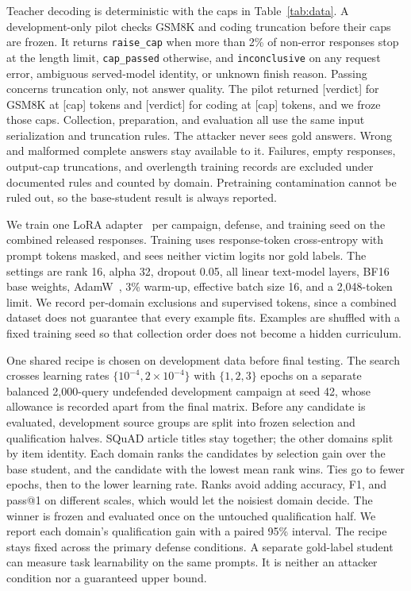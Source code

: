 \documentclass[journal]{IEEEtran}
\newcommand{\tbd}[1]{\textcolor{red!65!black}{[#1]}}
\begin{document}
Teacher decoding is deterministic with the caps in Table~\ref{tab:data}. A development-only pilot checks GSM8K and coding truncation before their caps are frozen. It returns \texttt{raise\_cap} when more than 2\% of non-error responses stop at the length limit, \texttt{cap\_passed} otherwise, and \texttt{inconclusive} on any request error, ambiguous served-model identity, or unknown finish reason. Passing concerns truncation only, not answer quality. The pilot returned \tbd{verdict} for GSM8K at \tbd{cap} tokens and \tbd{verdict} for coding at \tbd{cap} tokens, and we froze those caps. Collection, preparation, and evaluation all use the same input serialization and truncation rules. The attacker never sees gold answers. Wrong and malformed complete answers stay available to it. Failures, empty responses, output-cap truncations, and overlength training records are excluded under documented rules and counted by domain. Pretraining contamination cannot be ruled out, so the base-student result is always reported.

\label{sec:eval-models}
We train one LoRA adapter~\cite{hu2022lora} per campaign, defense, and training seed on the combined released responses. Training uses response-token cross-entropy with prompt tokens masked, and sees neither victim logits nor gold labels. The settings are rank 16, alpha 32, dropout 0.05, all linear text-model layers, BF16 base weights, AdamW~\cite{loshchilov2019adamw}, 3\% warm-up, effective batch size 16, and a 2,048-token limit. We record per-domain exclusions and supervised tokens, since a combined dataset does not guarantee that every example fits. Examples are shuffled with a fixed training seed so that collection order does not become a hidden curriculum.

One shared recipe is chosen on development data before final testing. The search crosses learning rates $\{10^{-4},2\times10^{-4}\}$ with $\{1,2,3\}$ epochs on a separate balanced 2,000-query undefended development campaign at seed 42, whose allowance is recorded apart from the final matrix. Before any candidate is evaluated, development source groups are split into frozen selection and qualification halves. SQuAD article titles stay together; the other domains split by item identity. Each domain ranks the candidates by selection gain over the base student, and the candidate with the lowest mean rank wins. Ties go to fewer epochs, then to the lower learning rate. Ranks avoid adding accuracy, F1, and pass@1 on different scales, which would let the noisiest domain decide. The winner is frozen and evaluated once on the untouched qualification half. We report each domain's qualification gain with a paired 95\% interval. The recipe stays fixed across the primary defense conditions. A separate gold-label student can measure task learnability on the same prompts. It is neither an attacker condition nor a guaranteed upper bound.
\end{document}

